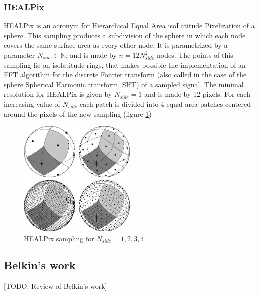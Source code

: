 \subsubsection{HEALPix}\label{sec:Chapter1:HEALPix}
HEALPix is an acronym for Hierarchical Equal Area isoLatitude Pixelization of a sphere. This sampling produces a subdivision of the sphere in which each node covers the same surface area as every other node. It is parametrized by a parameter $N_{side}\in\mathbb N$, and is made by $n=12N_{side}^2$ nodes. The points of this sampling lie on isolatitude rings, that makes possible the implementation of an FFT algorithm for the discrete Fourier transform (also called in the case of the sphere Spherical Harmonic transform, SHT) of a sampled signal. The minimal resolution for HEALPix is given by $N_{side}=1$ and is made by 12 pixels. For each increasing value of $N_{side}$ each patch is divided into 4 equal area patches centered around the pixels of the new sampling (figure \ref{fig:healpix sampling})
\begin{figure}
	\centering
	\includegraphics[width=0.5\textwidth]{figs/chapter1/healpix.jpg}
	\caption{\label{fig:healpix sampling}HEALPix sampling for $N_{side}=1,2,3,4$}
\end{figure}
\subsection{Belkin's work}
[TODO: Review of Belkin's work]
